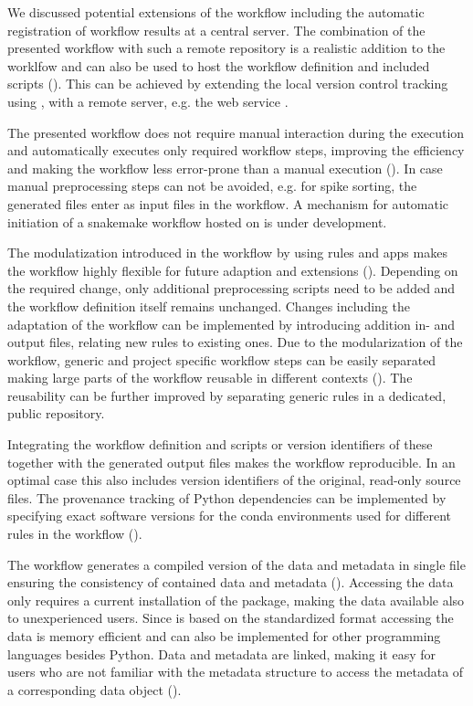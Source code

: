 We discussed potential extensions of the workflow including the automatic registration of workflow results at a central server. The combination of the presented workflow with such a remote repository is a realistic addition to the worklfow and can also be used to host the workflow definition and included scripts (). This can be achieved by extending the local version control tracking using ,  with a remote server, e.g. the  web service .

The presented workflow does not require manual interaction during the execution and automatically executes only required workflow steps, improving the efficiency and making the workflow less error-prone than a manual execution (). In case manual preprocessing steps can not be avoided, e.g. for spike sorting, the generated files enter as input files in the workflow. A mechanism for automatic initiation of a snakemake workflow hosted on  is under development.

The modulatization introduced in the workflow by using  rules and apps makes the workflow highly flexible for future adaption and extensions (). Depending on the required change, only additional preprocessing scripts need to be added and the workflow definition itself remains unchanged. Changes including the adaptation of the workflow can be implemented by introducing addition in- and output files, relating new  rules to existing ones.
Due to the modularization of the workflow, generic and project specific workflow steps can be easily separated making large parts of the workflow reusable in different contexts (). The reusability can be further improved by separating generic rules in a dedicated, public repository.

Integrating the workflow definition and scripts or version identifiers of these together with the generated output files makes the workflow reproducible. In an optimal case this also includes version identifiers of the original, read-only source files. The provenance tracking of Python dependencies can be implemented by specifying exact software versions for the conda environments used for different rules in the workflow ().

The workflow generates a compiled version of the data and metadata in single  file ensuring the consistency of contained data and metadata (). Accessing the data only requires a current installation of the  package, making the data available also to unexperienced users. Since  is based on the standardized  format accessing the data is memory efficient and can also be implemented for other programming languages besides Python. Data and metadata are linked, making it easy for users who are not familiar with the metadata structure to access the metadata of a corresponding data object ().

